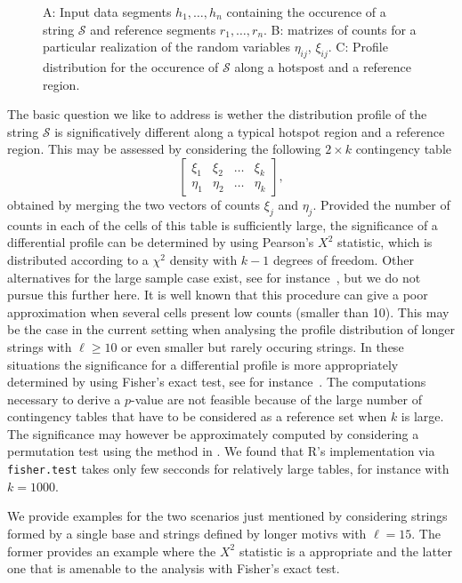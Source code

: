 \documentclass{bioinfo}
\begin{document}
\begin{figure}
 
 \caption{A: Input data segments $h_1, \ldots, h_n$ containing the
   occurence of a string $\mathcal S$ and reference segments $r_1,
   \ldots, r_n$. B: matrizes of counts for a
   particular realization of the random variables $\eta_{ij}$,
   $\xi_{ij}$. C: Profile distribution for the occurence of $\mathcal
   S$ along a hotspost and a reference region.} 
 \label{fig:methodscheme}
\end{figure}


The basic question we like to address is wether the distribution
profile of the string $\mathcal S$ is significatively different along
a typical hotspot region and a reference region. This may be assessed
by considering the following $2\times k$ contingency table 
\[
  \begin{bmatrix}
  \xi_1 & \xi_2 & \ldots & \xi_k\\
  \eta_1 & \eta_2 & \ldots & \eta_k
  \end{bmatrix},
\]
obtained by merging the two vectors of counts $\xi_j$ and
$\eta_j$. Provided the number of counts in each of the cells of this
table is sufficiently large, the significance of a differential
profile can be determined by using Pearson's $X^2$ statistic, which is
distributed according to a $\chi^2$ density with $k-1$ degrees of
freedom. Other alternatives for the large sample case exist, see for
instance~\cite{RC}, but we do not pursue this further here.  It is
well known that this procedure can give a poor approximation when
several cells present low counts (smaller than 10). This may be the
case in the current setting when analysing the profile distribution of
longer strings with $\ell \geq 10$ or even smaller but rarely occuring
strings. In these situations the significance for a differential
profile is more appropriately determined by using Fisher's exact test,
see for instance~\cite{A}. The computations necessary to derive a
$p$-value are not feasible because of the large number of contingency
tables that have to be considered as a reference set when $k$ is
large. The significance may however be approximately computed by
considering a permutation test using the method in \cite{P}. We found
that R's implementation via \texttt{fisher.test} takes only few
secconds for relatively large tables, for instance with $k=1000$. 

We provide examples for the two scenarios just mentioned by
considering strings formed by a single base and strings defined by
longer motivs with $\ell = 15$. The former provides an example where
the $X^2$ statistic is a appropriate and the latter one that is
amenable to the analysis with Fisher's exact test. 
\end{document}
